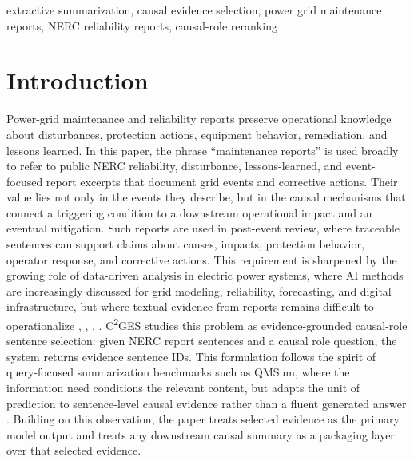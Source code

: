 \documentclass{ieeeaccess}
\begin{document}
\begin{keywords}
extractive summarization, causal evidence selection, power grid maintenance reports, NERC reliability reports, causal-role reranking
\end{keywords}
\titlepgskip=-21pt
\maketitle

\section{Introduction}

\label{sec:introduction}

Power-grid maintenance and reliability reports preserve operational knowledge about disturbances, protection actions, equipment behavior, remediation, and lessons learned. In this paper, the phrase ``maintenance reports'' is used broadly to refer to public NERC reliability, disturbance, lessons-learned, and event-focused report excerpts that document grid events and corrective actions. Their value lies not only in the events they describe, but in the causal mechanisms that connect a triggering condition to a downstream operational impact and an eventual mitigation. Such reports are used in post-event review, where traceable sentences can support claims about causes, impacts, protection behavior, operator response, and corrective actions. This requirement is sharpened by the growing role of data-driven analysis in electric power systems, where AI methods are increasingly discussed for grid modeling, reliability, forecasting, and digital infrastructure, but where textual evidence from reports remains difficult to operationalize \cite{xie2022massively}, \cite{srinivasan2023artificial}, \cite{hamann2024foundation}, \cite{madabhushi2023survey}. C\textsuperscript{2}GES studies this problem as evidence-grounded causal-role sentence selection: given NERC report sentences and a causal role question, the system returns evidence sentence IDs. This formulation follows the spirit of query-focused summarization benchmarks such as QMSum, where the information need conditions the relevant content, but adapts the unit of prediction to sentence-level causal evidence rather than a fluent generated answer \cite{zhong2021qmsum}. Building on this observation, the paper treats selected evidence as the primary model output and treats any downstream causal summary as a packaging layer over that selected evidence.
\end{document}

